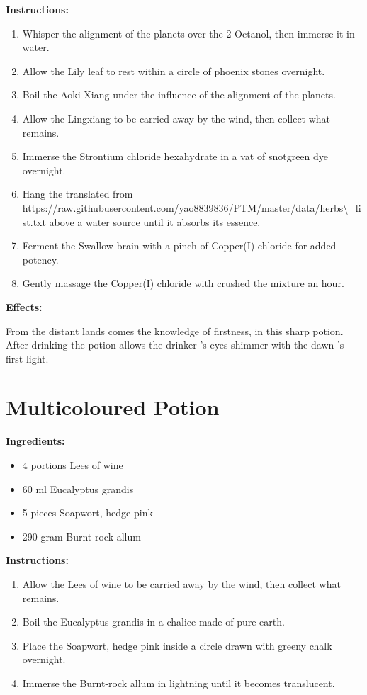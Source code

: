 \documentclass{article}
\begin{document}
\textbf{Instructions:}

\begin{enumerate}
  \item Whisper the alignment of the planets over the 2-Octanol, then immerse it in water.
  \item Allow the Lily leaf to rest within a circle of phoenix stones overnight.
  \item Boil the Aoki Xiang under the influence of the alignment of the planets.
  \item Allow the Lingxiang to be carried away by the wind, then collect what remains.
  \item Immerse the Strontium chloride hexahydrate in a vat of snotgreen dye overnight.
  \item Hang the translated from https://raw.githubusercontent.com/yao8839836/PTM/master/data/herbs\textbackslash{}_list.txt above a water source until it absorbs its essence.
  \item Ferment the Swallow-brain with a pinch of Copper(I) chloride for added potency.
  \item Gently massage the Copper(I) chloride with crushed the mixture an hour.
\end{enumerate}

\textbf{Effects:}

From the distant lands comes the knowledge of firstness, in this sharp potion. After drinking the potion allows the drinker 's eyes shimmer with the dawn 's first light.

\newpage
\section*{Multicoloured Potion}

\textbf{Ingredients:}

\begin{itemize}
  \item 4 portions Lees of wine
  \item 60 ml Eucalyptus grandis
  \item 5 pieces Soapwort, hedge pink
  \item 290 gram Burnt-rock allum
\end{itemize}

\textbf{Instructions:}

\begin{enumerate}
  \item Allow the Lees of wine to be carried away by the wind, then collect what remains.
  \item Boil the Eucalyptus grandis in a chalice made of pure earth.
  \item Place the Soapwort, hedge pink inside a circle drawn with greeny chalk overnight.
  \item Immerse the Burnt-rock allum in lightning until it becomes translucent.
\end{enumerate}
\end{document}
